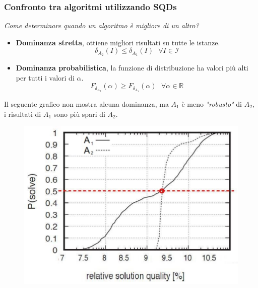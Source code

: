 \documentclass{article}
\begin{document}
\subsubsection{Confronto tra algoritmi utilizzando SQDs}
\textit{Come determinare quando un algoritmo è migliore di un altro?}
\begin{itemize}
    \item \textbf{Dominanza stretta}, ottiene migliori risultati su tutte le istanze.
          $$\delta_{A_2}(I)\leq\delta_{A_1}(I)\text{   }\forall I\in\mathcal{I}$$
    \item \textbf{Dominanza probabilistica}, la funzione di distribuzione ha valori più alti per
          tutti i valori di $\alpha$.
          $$F_{\delta_{A_2}}(\alpha)\geq F_{\delta_{A_1}}(\alpha)\text{   }\forall\alpha\in\mathbb{R}$$
\end{itemize}
Il seguente grafico non mostra alcuna dominanza, ma $A_1$ è meno \textit{"robusto"} di $A_2$, i
risultati di $A_1$ sono più spari di $A_2$.
\begin{figure}[H]
    \centering
    \includegraphics[scale=0.4]{images/SQD_3.png}
\end{figure}
\end{document}
